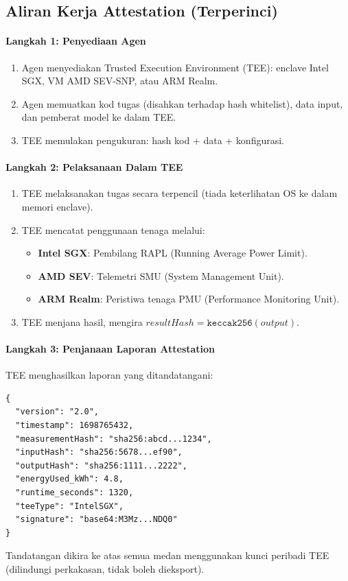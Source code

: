 \documentclass[11pt]{article}
\begin{document}
\subsection{Aliran Kerja Attestation (Terperinci)}
\label{sec:attestation-workflow}
\paragraph{Langkah 1: Penyediaan Agen}
\begin{enumerate}[noitemsep]
  \item Agen menyediakan Trusted Execution Environment (TEE): enclave Intel SGX, VM AMD SEV-SNP, atau ARM Realm.
  \item Agen memuatkan kod tugas (disahkan terhadap hash whitelist), data input, dan pemberat model ke dalam TEE.
  \item TEE memulakan pengukuran: hash kod + data + konfigurasi.
\end{enumerate}

\paragraph{Langkah 2: Pelaksanaan Dalam TEE}
\begin{enumerate}[noitemsep]
  \item TEE melaksanakan tugas secara terpencil (tiada keterlihatan OS ke dalam memori enclave).
  \item TEE mencatat penggunaan tenaga melalui:
    \begin{itemize}[noitemsep]
      \item \textbf{Intel SGX}: Pembilang RAPL (Running Average Power Limit).
      \item \textbf{AMD SEV}: Telemetri SMU (System Management Unit).
      \item \textbf{ARM Realm}: Peristiwa tenaga PMU (Performance Monitoring Unit).
    \end{itemize}
  \item TEE menjana hasil, mengira $resultHash = \texttt{keccak256}(output)$.
\end{enumerate}

\paragraph{Langkah 3: Penjanaan Laporan Attestation}
TEE menghasilkan laporan yang ditandatangani:
\begin{verbatim}
{
  "version": "2.0",
  "timestamp": 1698765432,
  "measurementHash": "sha256:abcd...1234",
  "inputHash": "sha256:5678...ef90",
  "outputHash": "sha256:1111...2222",
  "energyUsed_kWh": 4.8,
  "runtime_seconds": 1320,
  "teeType": "IntelSGX",
  "signature": "base64:M3Mz...NDQ0"
}
\end{verbatim}
Tandatangan dikira ke atas semua medan menggunakan kunci peribadi TEE (dilindungi perkakasan, tidak boleh dieksport).
\end{document}
